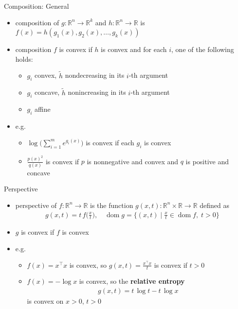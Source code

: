 \documentclass[10pt,handout]{beamer}
\newcommand{\ds}{\displaystyle}
\DeclareMathOperator*{\dom}{dom}
\theoremstyle{definition}
\begin{document}
\begin{frame}{Composition: General}
  \begin{itemize}
    \item composition of $g:\mathbb{R}^n\to\mathbb{R}^k$ and $h:\mathbb{R}^n\to\mathbb{R}$ is $\ds f(x) = h(g_1(x), g_2(x),\ldots, g_k(x))$
    \item composition $f$ is convex if $h$ is convex and for each $i$, one of the following holds:
      \begin{itemize}
        \item $g_i$ convex, $\ds\widetilde{h}$ nondecreasing in its $i$-th argument
        \item $g_i$ concave, $\ds\widetilde{h}$ nonincreasing in its $i$-th argument
        \item $g_i$ affine
      \end{itemize}
    \item e.g.
      \begin{itemize}
        \item $\ds\log\Big(\sum_{i = 1}^m e^{g_i(x)}\Big)$ is convex if each $g_i$ is convex
        \item $\ds\frac{p(x)^2}{q(x)}$ is convex if $p$ is nonnegative and convex and $q$ is positive and concave
      \end{itemize}
  \end{itemize}
\end{frame}

\begin{frame}{Perspective}
  \begin{itemize}
    \item perspective of $f:\mathbb{R}^n\to\mathbb{R}$ is the function $\ds g(x, t):\mathbb{R}^n\times\mathbb{R}\to\mathbb{R}$ defined as 
      \begin{align*}
        g(x, t) = t\,f\Big(\frac{x}{t}\Big), \quad\dom g = \Big\{(x, t)\;\Big|\;\frac{x}{t}\in\dom f,\;t > 0\Big\}
      \end{align*}
    \item $g$ is convex if $f$ is convex
    \item e.g.
      \begin{itemize}
        \item $\ds f(x) = x^\top x$ is convex, so $\ds g(x, t) = \frac{x^\top x}{t}$ is convex if $t > 0$
        \item $\ds f(x) = -\log x$ is convex, so the {\bf relative entropy} 
          \begin{align*}
            g(x, t) = t\,\log t - t\,\log x
          \end{align*} 
          is convex on $x > 0$, $t > 0$ 
      \end{itemize}
  \end{itemize}
\end{frame}
\end{document}
